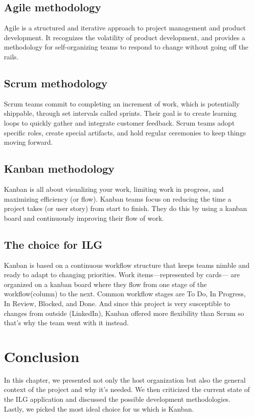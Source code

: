 \subsection{Agile methodology}
Agile is a structured and iterative approach to project management and product development. It recognizes the volatility of product development, and provides a methodology for self-organizing teams to respond to change without going off the rails.
\subsection{Scrum methodology}
Scrum teams commit to completing an increment of work, which is potentially shippable, through set intervals called sprints. Their goal is to create learning loops to quickly gather and integrate customer feedback. Scrum teams adopt specific roles, create special artifacts, and hold regular ceremonies to keep things moving forward.
\subsection{Kanban methodology}
Kanban is all about visualizing your work, limiting work in progress, and maximizing efficiency (or flow). Kanban teams focus on reducing the time a project takes (or user story) from start to finish. They do this by using a kanban board and continuously improving their flow of work.
\subsection{The choice for ILG}
Kanban is based on a continuous workflow structure that keeps teams nimble and ready to adapt to changing priorities. Work items—represented by cards— are organized on a kanban board where they flow from one stage of the workflow(column) to the next. Common workflow stages are To Do, In Progress, In Review, Blocked, and Done. And since this project is very susceptible to changes from outside (LinkedIn), Kanban offered more flexibility than Scrum so that’s why the team went with it instead.

\setcounter{secnumdepth}{0} %
\section{Conclusion}
In this chapter, we presented not only the host organization but also the general context of the project and why it's needed.
We then criticized the current state of the ILG application and discussed the possible development methodologies.
Lastly, we picked the most ideal choice for us which is Kanban.
